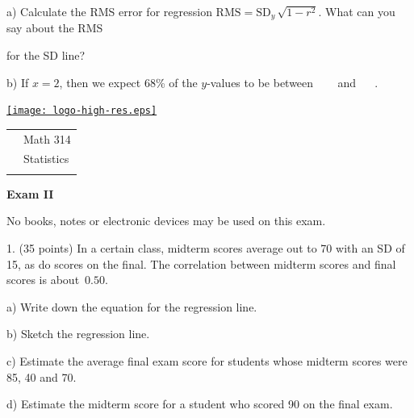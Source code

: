 \documentclass[10pt]{article}
\begin{document}
\hspace{20pt} a) Calculate the RMS error for regression 
$\mbox{RMS}=\mbox{SD}_y\,\sqrt{1-r^2}$.  What can you say about the RMS\vspace{-4pt}

\hspace{20pt}\hphantom{b) } for the SD line?
\vspace{1.6in}

\hspace{20pt} b) If $x=2$, then we expect 68\% of the $y$-values to be
between \ \underline{\hspace{60pt}} \ \ and \  \underline{\hspace{60pt}} \ .

\vfill
\eject

\pagestyle{empty}

\href{http://www.shepherd.edu}{\texttt{[image: logo-high-res.eps]}}
\vspace{-1.69cm}

{\small
\begin{tabular}{cl}
& Math 314\\
& Statistics\\
\hspace{5.28in} & %
\end{tabular}
}

\begin{center}
\textbf{\large  Exam II}
\end{center}
No books, notes or electronic devices may be used on this exam.
\medskip

1. (35 points) In a certain class, midterm scores average out to 70 with an SD of 15, as do 
scores on the final.  The correlation between midterm scores and final scores is 
about~$0.50$.   

\hspace{20pt} a) Write down the equation for the regression line. %
\vspace{1.0in}

\hspace{20pt} b) Sketch the regression line. %
\vspace{1.25in}

\hspace{20pt} c) 
Estimate the average final exam score for students whose midterm scores were
85, 40 and 70. %
\vspace{2.75in}

\hspace{20pt} d) Estimate the midterm score for a student who scored 90 on the final exam.
\vfill
\eject
{\ }
\end{document}
